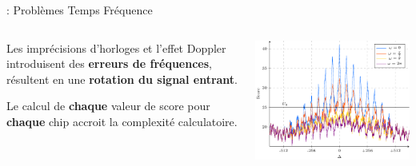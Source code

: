 \documentclass[../main.tex]{subfiles}
\begin{document}

\begin{frame}{\subsecname : {Problèmes Temps Fréquence}}
  \begin{columns}
    \begin{column}{.4\linewidth}
      \begin{ctrlitemize}{6pt}
        \item Les imprécisions d'horloges et l'effet Doppler introduisent des \textbf{erreurs de fréquences}, résultent en une \textbf{rotation du signal entrant}.
        \item Le calcul de \textbf{chaque} valeur de score pour \textbf{chaque} chip accroit la complexité calculatoire.
      \end{ctrlitemize}
    \end{column}
    \begin{column}{.6\linewidth}
      \centering
      \includegraphics[width=\linewidth, height=.75\textheight, keepaspectratio=true]{figures/pgfplots/score_function_stdl.pdf}
    \end{column}
  \end{columns}
\end{frame}
\end{document}
